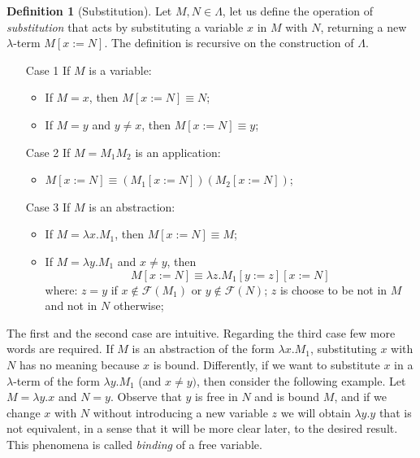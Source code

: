 \documentclass[a4paper,11pt]{article}
\theoremstyle{definition}
\newtheorem{defn}{Definition}
\newcommand{\FF}{\mathcal{F}}
\begin{document}
\begin{defn}[Substitution]
  \label{def:subs}
  Let $M,N\in\Lambda$, let us define the operation of \textit{substitution}
  that acts by substituting a variable $x$ in $M$ with $N$, returning a new 
  $\lambda$-term $M[x:=N]$. The
  definition is recursive on the construction of $\Lambda$.
  \begin{itemize}
    \item[{Case 1}] If $M$ is a variable:
      \begin{itemize}
        \item If $M=x$, then $M[x:=N]\equiv N$;
        \item If $M=y$ and $y\ne x$, then $M[x:=N]\equiv y$;
      \end{itemize}
    \item[Case 2] If $M=M_1M_2$ is an application:
      \begin{itemize}
        \item $M[x:=N]\equiv (M_1[x:=N])(M_2[x:=N])$; 
      \end{itemize}
    \item[Case 3] If $M$ is an abstraction:
      \begin{itemize}
        \item If $M=\lambda x.M_1$, then $M[x:=N] \equiv M$;
        \item If $M =\lambda y.M_1$ and $x\ne y$, then
          \[
            M[x:=N] \equiv\lambda z.M_1[y:=z][x:=N]
          \]
          where: $z=y$ if $x\not\in\FF(M_1)$ or $y\not\in\FF(N)$; 
          $z$ is choose to be not in $M$ and not in $N$ otherwise;
      \end{itemize}
  \end{itemize}
\end{defn}

The first and the second case are intuitive. Regarding the third case few
more words are required. If $M$ is an abstraction of the form $\lambda
x.M_1$, substituting $x$ with $N$ has no meaning because $x$ is bound.
Differently, if we want to substitute $x$ in a $\lambda$-term of the form
$\lambda y.M_1$ (and $x\ne y)$, then consider the following example. Let
$M=\lambda y.x$ and $N=y$. Observe that $y$ is free in $N$ and is bound $M$,
and if we change $x$ with $N$ without introducing a new variable $z$ we will
obtain $\lambda y.y$ that is not equivalent, in a sense that it will be more
clear later, to the desired result. This phenomena is called \textit{binding}
of a free variable.
\end{document}
